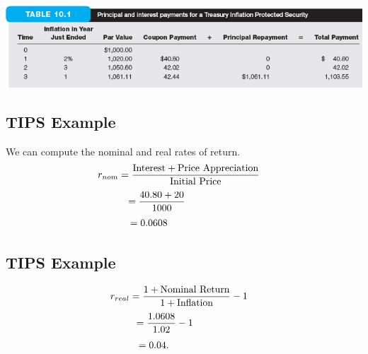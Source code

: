 \documentclass[letterpaper,10pt,english]{sphinxmanual}
\begin{document}
\includegraphics[width=6in]{table10_1_lg.jpg}


\subsection{TIPS Example}
\label{bondPrices:id3}
We can compute the nominal and real rates of return.
\begin{gather}
\begin{split}r_{nom} & = \frac{\text{Interest} + \text{Price
Appreciation}}{\text{Initial Price}}\end{split}\notag
\end{gather}\begin{gather}
\begin{split}& = \frac{40.80 + 20}{1000} \qquad \qquad \enspace \;\end{split}\notag
\end{gather}\begin{gather}
\begin{split}& = 0.0608 \qquad \qquad \quad \quad \; \,\end{split}\notag
\end{gather}

\subsection{TIPS Example}
\label{bondPrices:id4}\begin{gather}
\begin{split}r_{real} & = \frac{1+\text{Nominal Return}}{1+\text{Inflation}} - 1\end{split}\notag
\end{gather}\begin{gather}
\begin{split}& = \frac{1.0608}{1.02} - 1 \qquad \quad \:\end{split}\notag
\end{gather}\begin{gather}
\begin{split}& = 0.04. \qquad \qquad \quad \enspace\end{split}\notag
\end{gather}
\end{document}
